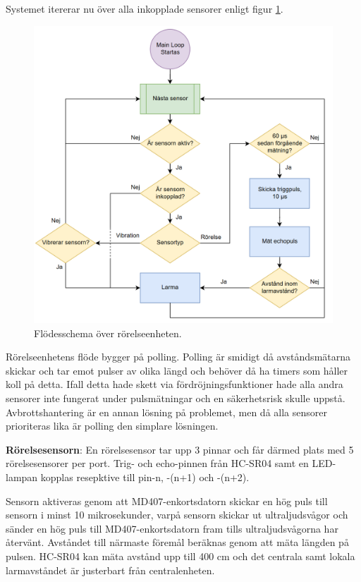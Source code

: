 \documentclass{article}
\begin{document}
\begin{flushleft}
Systemet itererar nu över alla inkopplade sensorer enligt figur \ref{fig:MotionFlow}. \linebreak \newline
\end{flushleft}

\begin{figure}
\centering
\includegraphics[scale=0.3]{figurer/FlowchartMotion.png}
\caption{Flödesschema över rörelseenheten.}
 \label{fig:MotionFlow}
\end{figure}

Rörelseenhetens flöde bygger på polling. Polling är smidigt då avståndsmätarna skickar och tar emot pulser av olika längd 
och behöver då ha timers som håller koll på detta. Ifall detta hade skett via fördröjningsfunktioner hade alla andra sensorer 
inte fungerat under pulsmätningar och en säkerhetsrisk skulle uppstå. Avbrottshantering är en annan lösning på problemet, 
men då alla sensorer prioriteras lika är polling den simplare lösningen.


\textbf{Rörelsesensorn}:
En rörelsesensor tar upp 3 pinnar och får därmed plats med 5 rörelsesensorer per port.
Trig- och echo-pinnen från HC-SR04 samt en LED-lampan kopplas resepktive till  pin-n, -(n+1) och -(n+2).


Sensorn aktiveras genom att MD407-enkortsdatorn skickar en hög puls till sensorn i minst 10 mikrosekunder, 
varpå sensorn skickar ut ultraljudsvågor och sänder en hög puls till MD407-enkortsdatorn fram tills 
ultraljudsvågorna har återvänt. Avståndet till närmaste föremål beräknas genom att mäta längden på pulsen.
HC-SR04 kan mäta avstånd upp till 400 cm och det centrala samt lokala larmavståndet är justerbart från centralenheten.
\end{document}
